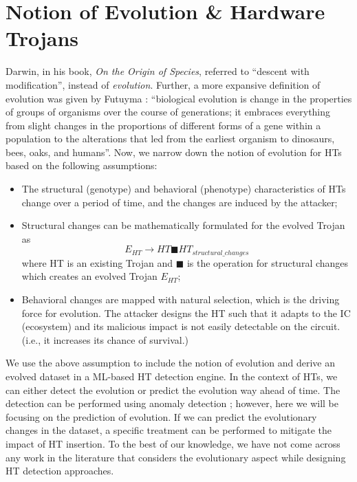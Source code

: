\section*{Notion of Evolution \& Hardware Trojans} 
\label{sec:Evolution}
Darwin, in his book, \textit{On the Origin of Species}, referred to ``descent with modification'', instead of \textit{evolution}. Further, a more expansive definition of evolution was given by Futuyma \cite{laland2014does}: ``biological evolution is change in the properties of groups of organisms over the course of generations; it embraces everything from slight changes in the proportions of different forms of a gene within a population to the alterations that led from the earliest organism to dinosaurs, bees, oaks, and humans''. Now, we narrow down the notion of evolution for HTs based on the following assumptions:

\begin{itemize}
    \item The structural (genotype) and behavioral (phenotype) characteristics of HTs change over a period of time, and the changes are induced by the attacker;
    \item Structural changes can be mathematically formulated for the evolved Trojan as \[ E_{HT} \rightarrow HT \blacksquare HT_{structural\_changes} \] 
    where HT is an existing Trojan and $\blacksquare$ is the operation for structural changes which creates an evolved Trojan $E_{HT}$;
    \item Behavioral changes are mapped with natural selection, which is the driving force for evolution. The attacker designs the HT such that it adapts to the IC (ecosystem) and its malicious impact is not easily detectable on the circuit. (i.e., it increases its chance of survival.)
\end{itemize}

We use the above assumption to include the notion of evolution and derive an evolved dataset in a ML-based HT detection engine. In the context of HTs, we can either detect the evolution or predict the evolution way ahead of time. The detection can be performed using anomaly detection \cite{liu2022anomaly}; however, here we will be focusing on the prediction of evolution. If we can predict the evolutionary changes in the dataset, a specific treatment can be performed to mitigate the impact of HT insertion. To the best of our knowledge, we have not come across any work in the literature that considers the evolutionary aspect while designing HT detection approaches.

